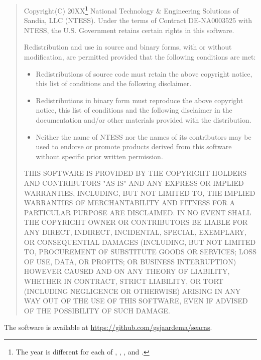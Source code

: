 \begin{quote}
Copyright(C) 20XX\footnote{The year is different for each of \epu{},
\exodiff, \ejoin, and \conjoin.} National Technology & Engineering Solutions
of Sandia, LLC (NTESS).  Under the terms of Contract DE-NA0003525 with
NTESS, the U.S. Government retains certain rights in this software.

Redistribution and use in source and binary forms, with or without
modification, are permitted provided that the following conditions are
met:

\begin{itemize}
\item Redistributions of source code must retain the above copyright
      notice, this list of conditions and the following disclaimer.

\item Redistributions in binary form must reproduce the above
      copyright notice, this list of conditions and the following
      disclaimer in the documentation and/or other materials provided
      with the distribution.

\item Neither the name of NTESS nor the names of its
      contributors may be used to endorse or promote products derived
      from this software without specific prior written permission.
\end{itemize}

THIS SOFTWARE IS PROVIDED BY THE COPYRIGHT HOLDERS AND CONTRIBUTORS
"AS IS" AND ANY EXPRESS OR IMPLIED WARRANTIES, INCLUDING, BUT NOT
LIMITED TO, THE IMPLIED WARRANTIES OF MERCHANTABILITY AND FITNESS FOR
A PARTICULAR PURPOSE ARE DISCLAIMED. IN NO EVENT SHALL THE COPYRIGHT
OWNER OR CONTRIBUTORS BE LIABLE FOR ANY DIRECT, INDIRECT, INCIDENTAL,
SPECIAL, EXEMPLARY, OR CONSEQUENTIAL DAMAGES (INCLUDING, BUT NOT
LIMITED TO, PROCUREMENT OF SUBSTITUTE GOODS OR SERVICES; LOSS OF USE,
DATA, OR PROFITS; OR BUSINESS INTERRUPTION) HOWEVER CAUSED AND ON ANY
THEORY OF LIABILITY, WHETHER IN CONTRACT, STRICT LIABILITY, OR TORT
(INCLUDING NEGLIGENCE OR OTHERWISE) ARISING IN ANY WAY OUT OF THE USE
OF THIS SOFTWARE, EVEN IF ADVISED OF THE POSSIBILITY OF SUCH DAMAGE.
\end{quote}

The software is available at \url{https://github.com/gsjaardema/seacas}.
